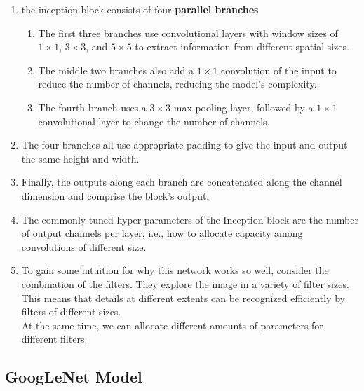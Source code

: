 \begin{enumerate}[itemsep=0.1cm]
    \item the inception block consists of four \textbf{parallel branches}
    \begin{enumerate}
        \item The first three branches use convolutional layers with window sizes of $1\times 1$, $3\times 3$, and $5\times 5$ to extract information from different spatial sizes. 
        
        \item The middle two branches also add a $1\times 1$ convolution of the input to reduce the number of channels, reducing the model’s complexity. 
        
        \item The fourth branch uses a $3\times 3$ max-pooling layer, followed by a $1\times 1$ convolutional layer to change the number of channels.

    \end{enumerate}

    \item The four branches all use appropriate padding to give the input and output the same height and width. 

    \item Finally, the outputs along each branch are concatenated along the channel dimension and comprise the block’s output. 

    \item The commonly-tuned hyper-parameters of the Inception block are the number of output channels per layer, i.e., how to allocate capacity among convolutions of different size.

    \item To gain some intuition for why this network works so well, consider the combination of the filters. They explore the image in a variety of filter sizes.\\
    This means that details at different extents can be recognized efficiently by filters of different sizes.\\
    At the same time, we can allocate different amounts of parameters for different filters.

\end{enumerate}


\subsection{GoogLeNet Model \cite{dnn-1}}


